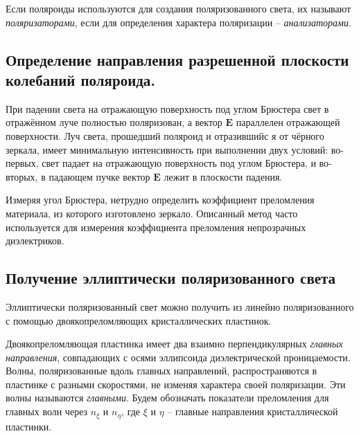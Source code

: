 \documentclass[a4paper,12pt]{article}
\begin{document}
Если поляроиды используются для создания поляризованного света, их называют \textit{поляризаторами}, если для определения характера поляризации -- \textit{анализаторами}.

\subsection{Определение направления разрешенной плоскости колебаний поляроида.}
При падении света на отражающую поверхность под углом Брюстера свет в отражённом луче полностью поляризован, а вектор $\mathbf{E}$ параллелен отражающей поверхности. Луч света, прошедший поляроид и отразившийс я от чёрного зеркала, имеет минимальную интенсивность при выполнении двух условий: во-первых, свет падает на отражающую поверхность под углом Брюстера, и во-вторых, в падающем пучке вектор $\mathbf{E}$ лежит в плоскости падения.

Измеряя угол Брюстера, нетрудно определить коэффициент преломления материала, из
которого изготовлено зеркало. Описанный метод часто используется для измерения
коэффициента преломления непрозрачных диэлектриков.

\subsection{Получение эллиптически поляризованного света}
Эллиптически поляризованный свет можно получить из линейно поляризованного с
помощью двоякопреломляющих кристаллических пластинок.

Двоякопреломляющая пластинка имеет два взаимно перпендикулярных \textit{главных направления}, совпадающих с осями эллипсоида диэлектрической проницаемости. Волны, поляризованные вдоль главных направлений, распространяются в пластинке с разными скоростями, не изменяя характера своей поляризации. Эти волны называются \textit{главными}. Будем обозначать показатели преломления для главных волн через
$n_\xi$ и $n_\eta$, где $\xi$ и $\eta$ -- главные направления кристаллической пластинки.
\end{document}
